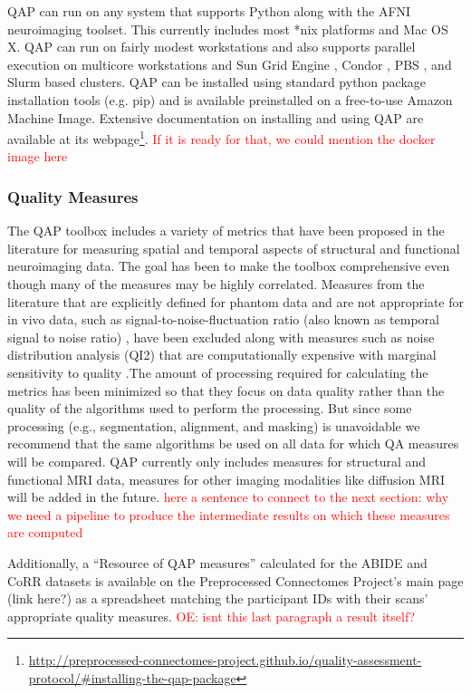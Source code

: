 \documentclass{frontiersSCNS} %
\newcommand\ccnotes[1]{\textcolor{red}{#1}}
\begin{document}
QAP can run on any system that supports Python along with the AFNI neuroimaging toolset. This currently includes most *nix platforms and Mac OS X. QAP can run on fairly modest workstations and also supports parallel execution on multicore workstations and Sun Grid Engine \citep{Gentzsch2001}, Condor \citep{condor2005}, PBS \citep{pbs2001}, and Slurm \citep{slurm2002} based clusters. QAP can be installed using standard python package installation tools (e.g. pip) and is available preinstalled on a free-to-use Amazon Machine Image. Extensive documentation on installing and using QAP are available at its webpage\footnote{\url{http://preprocessed-connectomes-project.github.io/quality-assessment-protocol/\#installing-the-qap-package}}.
\ccnotes{If it is ready for that, we could mention the docker image here}


\subsubsection{Quality Measures}
\label{sec:22}
The QAP toolbox includes a variety of metrics that have been proposed in the literature for measuring spatial and temporal aspects of structural and functional neuroimaging data. The goal has been to make the toolbox comprehensive even though many of the measures may be highly correlated. Measures from the literature that are explicitly defined for phantom data and are not appropriate for in vivo data, such as signal-to-noise-fluctuation ratio (also known as temporal signal to noise ratio) \citep{Friedman2006}, have been excluded along with measures such as noise distribution analysis (QI2) that are computationally expensive with marginal sensitivity to quality \citep{mortamet2009}.The amount of processing required for calculating the metrics has been minimized so that they focus on data quality rather than the quality of the algorithms used to perform the processing. But since some processing (e.g., segmentation, alignment, and masking) is unavoidable we recommend that the same algorithms be used on all data for which QA measures will be compared. QAP currently only includes measures for structural and functional MRI data, measures for other imaging modalities like diffusion MRI will be added in the future.
\ccnotes{here a sentence to connect to the next section: why we need a pipeline to produce the intermediate results on which these measures are computed}

Additionally, a ``Resource of QAP measures'' calculated for the ABIDE and CoRR datasets is available on the Preprocessed Connectomes Project's main page (link here?) as a spreadsheet matching the participant IDs with their scans' appropriate quality measures. \ccnotes{OE: isnt this last paragraph a result itself?}
\end{document}
